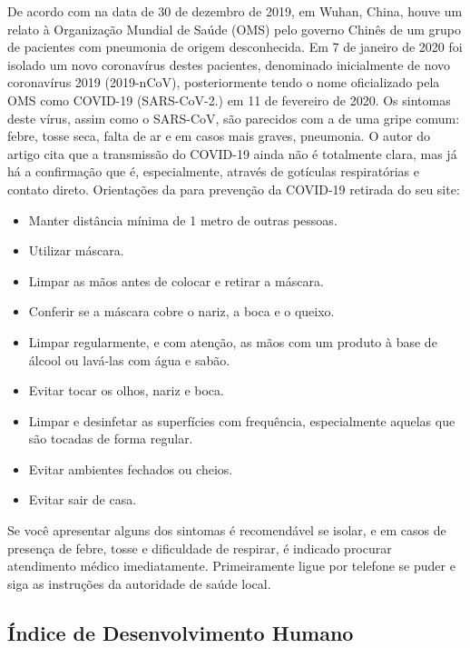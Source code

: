 \documentclass[
  fleqn,ebook]{ic}
\providecommand{\tightlist}{%
  \setlength{\itemsep}{0pt}\setlength{\parskip}{0pt}}
\begin{document}
De acordo com \cite{guarner2020three} na data de 30 de dezembro de 2019, em
Wuhan, China, houve um relato à Organização Mundial de Saúde (OMS) pelo governo
Chinês de um grupo de pacientes com pneumonia de origem desconhecida. Em 7 de
janeiro de 2020 foi isolado um novo coronavírus destes pacientes, denominado
inicialmente de novo coronavírus 2019 (2019-nCoV), posteriormente tendo o nome
oficializado pela OMS como COVID-19 (SARS-CoV-2.) em 11 de fevereiro de 2020. Os
sintomas deste vírus, assim como o SARS-CoV, são parecidos com a de uma gripe
comum: febre, tosse seca, falta de ar e em casos mais graves, pneumonia. O autor
do artigo \cite{qing2020possibility} cita que a transmissão do COVID-19 ainda
não é totalmente clara, mas já há a confirmação que é, especialmente, através de
gotículas respiratórias e contato direto. Orientações da \cite{covid19OMS} para
prevenção da COVID-19 retirada do seu site:

\begin{itemize}
\tightlist
\item
  Manter distância mínima de 1 metro de outras pessoas.
\item
  Utilizar máscara.
\item
  Limpar as mãos antes de colocar e retirar a máscara.
\item
  Conferir se a máscara cobre o nariz, a boca e o queixo.
\item
  Limpar regularmente, e com atenção, as mãos com um produto à base de álcool ou
  lavá-las com água e sabão.
\item
  Evitar tocar os olhos, nariz e boca.
\item
  Limpar e desinfetar as superfícies com frequência, especialmente aquelas que
  são tocadas de forma regular.
\item
  Evitar ambientes fechados ou cheios.
\item
  Evitar sair de casa.
\end{itemize}

Se você apresentar alguns dos sintomas é recomendável se isolar, e em casos de
presença de febre, tosse e dificuldade de respirar, é indicado procurar
atendimento médico imediatamente. Primeiramente ligue por telefone se puder e
siga as instruções da autoridade de saúde local.

\hypertarget{uxedndice-de-desenvolvimento-humano}{%
\subsection{Índice de Desenvolvimento Humano}\label{uxedndice-de-desenvolvimento-humano}}
\end{document}
